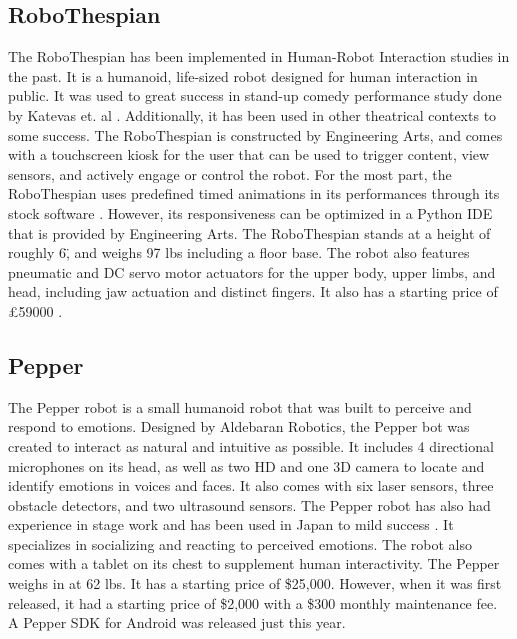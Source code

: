 \subsection{RoboThespian}
The RoboThespian has been implemented in Human-Robot Interaction studies in the past.
It is a humanoid, life-sized robot designed for human interaction in public.
It was used to great success in stand-up comedy performance study done by Katevas et. al \cite{KatevasRobot:2014}.
Additionally, it has been used in other theatrical contexts \cite{Spillikin} to some success.
The RoboThespian is constructed by Engineering Arts, and comes with a touchscreen kiosk for the user that can be used to trigger content, view sensors, and actively engage or control the robot.
For the most part, the RoboThespian uses predefined timed animations in its performances through its stock software \cite{KatevasRobot:2014}.
However, its responsiveness can be optimized in a Python IDE that is provided by Engineering Arts.
The RoboThespian stands at a height of roughly 6\", and weighs 97 lbs including a floor base.
The robot also features pneumatic and DC servo motor actuators for the upper body, upper limbs, and head, including jaw actuation and distinct fingers.
It also has a starting price of \pounds59000 \cite{EngineeredArts}.


\subsection{Pepper}
The Pepper robot is a small humanoid robot that was built to perceive and respond to emotions.
Designed by Aldebaran Robotics, the Pepper bot was created to interact as natural and intuitive as possible.
It includes 4 directional microphones on its head, as well as two HD and one 3D camera to locate and identify emotions in voices and faces.
It also comes with six laser sensors, three obstacle detectors, and two ultrasound sensors.
The Pepper robot has also had experience in stage work and has been used in Japan to mild success \cite{PepperVid}.
It specializes in socializing and reacting to perceived emotions.
The robot also comes with a tablet on its chest to supplement human interactivity.
The Pepper weighs in at 62 lbs.
It has a starting price of \$25,000. However, when it was first released, it had a starting price of \$2,000 with a \$300 monthly maintenance fee.
A Pepper SDK for Android was released just this year. \cite{PepperBot}

